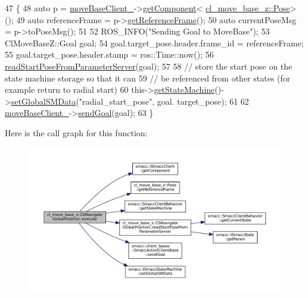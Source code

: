 \begin{DoxyCode}
47 \{
48     \textcolor{keyword}{auto} p = \hyperlink{classcl__move__base__z_1_1CbNavigateGlobalPosition_a460d6b43834cb52baa94d22cd3a6fd2b}{moveBaseClient\_}->\hyperlink{classsmacc_1_1ISmaccClient_adef78db601749ca63c19e74a27cb88cc}{getComponent}<
      \hyperlink{classcl__move__base__z_1_1Pose}{cl\_move\_base\_z::Pose}>();
49     \textcolor{keyword}{auto} referenceFrame = p->\hyperlink{classcl__move__base__z_1_1Pose_af8c2dc151e74aa8da6b283d1c8563051}{getReferenceFrame}();
50     \textcolor{keyword}{auto} currentPoseMsg = p->toPoseMsg();
51 
52     ROS\_INFO(\textcolor{stringliteral}{"Sending Goal to MoveBase"});
53     ClMoveBaseZ::Goal goal;
54     goal.target\_pose.header.frame\_id = referenceFrame;
55     goal.target\_pose.header.stamp = ros::Time::now();
56     \hyperlink{classcl__move__base__z_1_1CbNavigateGlobalPosition_a868b25f238e3781c9a2e44b4e1502fcc}{readStartPoseFromParameterServer}(goal);
57 
58     \textcolor{comment}{// store the start pose on the state machine storage so that it can}
59     \textcolor{comment}{// be referenced from other states (for example return to radial start)}
60     this->\hyperlink{classsmacc_1_1SmaccClientBehavior_aa817da149f366f6a28794c04eb0744b0}{getStateMachine}()->\hyperlink{classsmacc_1_1ISmaccStateMachine_a8588f9e580fbb95b53e2bd2ca3ff1f98}{setGlobalSMData}(\textcolor{stringliteral}{"radial\_start\_pose"}, goal.
      target\_pose);
61 
62     \hyperlink{classcl__move__base__z_1_1CbNavigateGlobalPosition_a460d6b43834cb52baa94d22cd3a6fd2b}{moveBaseClient\_}->\hyperlink{classsmacc_1_1client__bases_1_1SmaccActionClientBase_a9c47a5094ac8afb01680307fe5eca922}{sendGoal}(goal);
63 \}
\end{DoxyCode}
Here is the call graph for this function\+:
\nopagebreak
\begin{figure}[H]
\begin{center}
\leavevmode
\includegraphics[width=350pt]{classcl__move__base__z_1_1CbNavigateGlobalPosition_a0b8525ea9e4388b27cb1f9b1e06a3b63_cgraph}
\end{center}
\end{figure}
